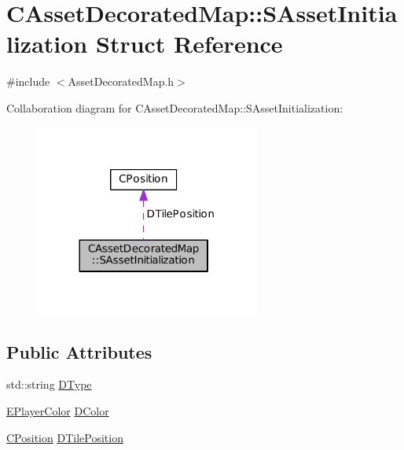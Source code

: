 \hypertarget{structCAssetDecoratedMap_1_1SAssetInitialization}{}\section{C\+Asset\+Decorated\+Map\+:\+:S\+Asset\+Initialization Struct Reference}
\label{structCAssetDecoratedMap_1_1SAssetInitialization}


{\ttfamily \#include $<$Asset\+Decorated\+Map.\+h$>$}



Collaboration diagram for C\+Asset\+Decorated\+Map\+:\+:S\+Asset\+Initialization\+:\nopagebreak
\begin{figure}[H]
\begin{center}
\leavevmode
\includegraphics[width=209pt]{structCAssetDecoratedMap_1_1SAssetInitialization__coll__graph}
\end{center}
\end{figure}
\subsection*{Public Attributes}
\begin{DoxyCompactItemize}
\item 
std\+::string \hyperlink{structCAssetDecoratedMap_1_1SAssetInitialization_acc1ab65366ed9e00080b71c541f3b72d}{D\+Type}
\item 
\hyperlink{GameDataTypes_8h_aafb0ca75933357ff28a6d7efbdd7602f}{E\+Player\+Color} \hyperlink{structCAssetDecoratedMap_1_1SAssetInitialization_a56ad740f8d319066e5ef5781fe6c636f}{D\+Color}
\item 
\hyperlink{classCPosition}{C\+Position} \hyperlink{structCAssetDecoratedMap_1_1SAssetInitialization_a2579060dadc045d36f4e316096827471}{D\+Tile\+Position}
\end{DoxyCompactItemize}


